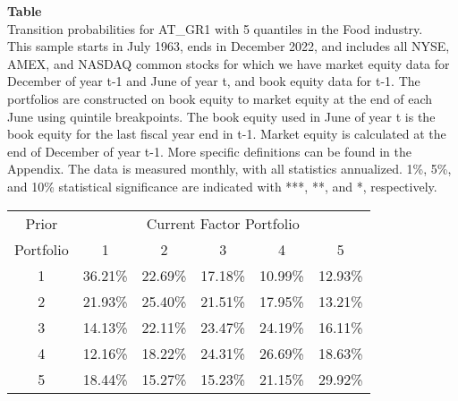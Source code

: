 \begin{table*}[ht!]
\raggedright
{}
\label{tab: transition_probs_AT_GR1_Food_with_5_quantiles}
\textbf{Table \thetable} \\
Transition probabilities for AT_GR1 with 5 quantiles in the Food industry. \\
\hspace*{1em}This sample starts in July 1963, ends in December 2022, and includes all NYSE, AMEX, and NASDAQ common stocks for which we have market equity data for December of year t-1 and June of year t, and book equity data for t-1. The portfolios are constructed on book equity to market equity at the end of each June using quintile breakpoints.  The book equity used in June of year t is the book equity for the last fiscal year end in t-1.  Market equity is calculated at the end of December of year t-1.  More specific definitions can be found in the Appendix.  The data is measured monthly, with all statistics annualized.  1\%, 5\%, and 10\% statistical significance are indicated with ***, **, and *, respectively. \\
\vspace{0.5em}
\centering
\begin{adjustbox}{max width=\textwidth}
\begin{tabular}{@{}cccccc@{}}
\toprule
Prior & \multicolumn{5}{c}{Current Factor Portfolio} \\
Portfolio & 1 & 2 & 3 & 4 & 5 \\
\midrule
1 & 36.21\% & 22.69\% & 17.18\% & 10.99\% & 12.93\% \\
2 & 21.93\% & 25.40\% & 21.51\% & 17.95\% & 13.21\% \\
3 & 14.13\% & 22.11\% & 23.47\% & 24.19\% & 16.11\% \\
4 & 12.16\% & 18.22\% & 24.31\% & 26.69\% & 18.63\% \\
5 & 18.44\% & 15.27\% & 15.23\% & 21.15\% & 29.92\% \\
\bottomrule
\end{tabular}
\end{adjustbox}
\end{table*}